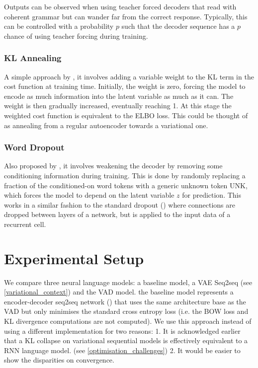 \documentclass[12pt,twoside]{report}
\begin{document}
Outputs can be observed when using teacher forced decoders that read with coherent grammar but can wander far from the correct response. Typically, this can be controlled with a probability $p$ such that the decoder sequence has a $p$ chance of using teacher forcing during training.

\subsection{KL Annealing}

A simple approach by \cite{bowman_generating_2015}, it involves adding a variable weight to the KL term in the cost function at training time. Initially, the weight is zero, forcing the model to encode as much information into the latent variable as much as it can. The weight is then gradually increased, eventually reaching 1. At this stage the weighted cost function is equivalent to the ELBO loss. This could be thought of as annealing from a regular autoencoder towards a variational one.

\subsection{Word Dropout}
Also proposed by \cite{bowman_generating_2015}, it involves weakening the decoder by removing some conditioning information during training. This is done by randomly replacing a fraction of the conditioned-on word tokens with a generic unknown token UNK, which forces the model to depend on the latent variable $z$ for prediction. This works in a similar fashion to the standard dropout (\cite{srivastava_dropout:_2014}) where connections are dropped between layers of a network, but is applied to the input data of a recurrent cell.

\chapter{Experimental Setup}

We compare three neural language models: a baseline model, a VAE Seq2seq (see \ref{variational_context}) and the VAD model. the baseline model represents a encoder-decoder seq2seq network (\cite{serban_hierarchical_2016}) that uses the same architecture base as the VAD but only minimises the standard cross entropy loss (i.e. the BOW loss and KL divergence computations are not computed). We use this approach instead of using a different implementation for two reasons: 1. It is acknowledged earlier that a KL collapse on variational sequential models is effectively equivalent to a RNN language model. (see \ref{optimisation_challenges}) 2. It would be easier to show the disparities on convergence.
\end{document}
